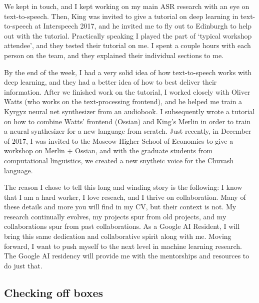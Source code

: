 \documentclass[12pt,a4paper]{article}
\begin{document}
We kept in touch, and I kept working on my main ASR research with an eye on text-to-speech. Then, King was invited to give a tutorial on deep learning in text-to-speech at Interspeech 2017, and he invited me to fly out to Edinburgh to help out with the tutorial. Practically speaking I played the part of `typical workshop attendee', and they tested their tutorial on me. I spent a couple hours with each person on the team, and they explained their individual sections to me.

By the end of the week, I had a very solid idea of how text-to-speech works with deep learning, and they had a better idea of how to best deliver their information. After we finished work on the tutorial, I worked closely with Oliver Watts (who works on the text-processing frontend), and he helped me train a Kyrgyz neural net synthesizer from an audiobook. I subsequently wrote a tutorial on how to combine Watts' frontend (Ossian) and King's Merlin in order to train a neural synthesizer for a new language from scratch. Just recently, in December of 2017, I was invited to the Moscow Higher School of Economics to give a workshop on Merlin + Ossian, and with the graduate students from computational linguistics, we created a new snytheic voice for the Chuvash language.

The reason I chose to tell this long and winding story is the following: I know that I am a hard worker, I love reseach, and I thrive on collaboration. Many of these details and more you will find in my CV, but their context is not. My research continually evolves, my projects spur from old projects, and my collaborations spur from past collaborations. As a Google AI Resident, I will bring this same dedication and collaborative spirit along with me. Moving forward, I want to push myself to the next level in machine learning research. The Google AI residency will provide me with the mentorships and resources to do just that.

\subsection*{Checking off boxes}
\end{document}
